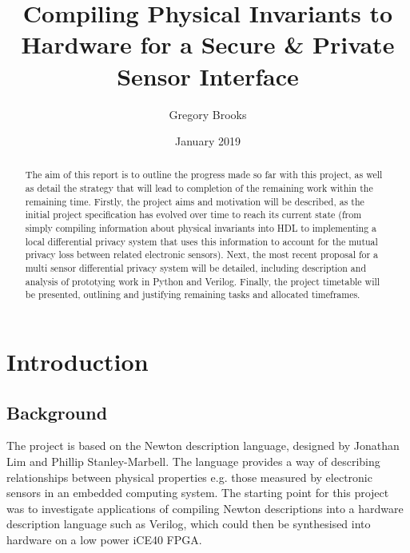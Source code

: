 \documentclass[pageno]{jpaper}
\begin{document}
\title{
Compiling Physical Invariants to Hardware for a Secure \& Private Sensor Interface}

\author{Gregory Brooks}
\date{January 2019}
\maketitle

\thispagestyle{empty}



\begin{abstract}

The aim of this report is to outline the progress made so far with this project, as well as detail the strategy that will lead to completion of the remaining work within the remaining time. Firstly, the project aims and motivation will be described, as the initial project specification has evolved over time to reach its current state (from simply compiling information about physical invariants into HDL to implementing a local differential privacy system that uses this information to account for the mutual privacy loss between related electronic sensors). Next, the most recent proposal for a multi sensor differential privacy system will be detailed, including description and analysis of prototying work in Python and Verilog. Finally, the project timetable will be presented, outlining and justifying remaining tasks and allocated timeframes.

\end{abstract}

\section{Introduction}
\subsection{Background}

The project is based on the Newton description language, designed by Jonathan Lim and Phillip Stanley-Marbell\cite{Newton}. The language provides a way of describing relationships between physical properties e.g. those measured by electronic sensors in an embedded computing system. The starting point for this project was to investigate applications of compiling Newton descriptions into a hardware description language such as Verilog, which could then be synthesised into hardware on a low power iCE40\cite{iCE40} FPGA.
\end{document}
